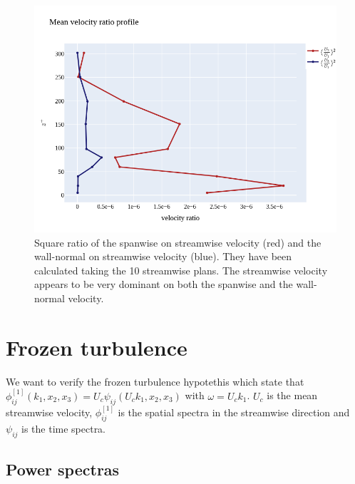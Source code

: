\documentclass[]{article}
\theoremstyle{plain}
\theoremstyle{remark}
\begin{document}
\begin{figure}[h!]
	\begin{center}
	\includegraphics[width=\textwidth]{../output/velocity_profile.png}
	\caption{Square ratio of the spanwise on streamwise velocity (red) and the wall-normal on streamwise velocity (blue). They have been calculated taking the 10 streamwise plans. The streamwise velocity appears to be very dominant on both the spanwise and the wall-normal velocity.}
	\end{center}
\end{figure}

\section*{Frozen turbulence}
We want to verify the frozen turbulence hypotethis which state that $\phi_{ij}^{[1]}(k_1,x_2,x_3)=U_c\psi_{ij}(U_ck_1,x_2,x_3)$ with $\omega=U_ck_1$. $U_c$ is the mean streamwise velocity, $\phi_{ij}^{[1]}$ is the spatial spectra in the streamwise direction and $\psi_{ij}$ is the time spectra.
\subsection*{Power spectras}
\end{document}
